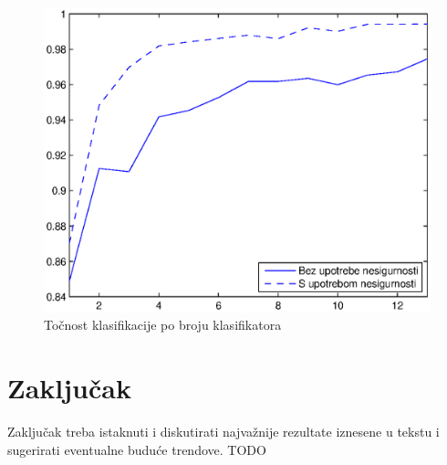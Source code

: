 \documentclass[a4paper,twocolumn,dvipdfm]{article}
\begin{document}
\begin{figure}
\centering
\includegraphics[scale=0.5]{accByClassifCount.eps}
\caption{Točnost klasifikacije po broju klasifikatora}
\label{figure:rezPoBrojuKlas}
\end{figure}


\section{Zaključak}
Zaključak treba istaknuti i diskutirati najvažnije rezultate iznesene u tekstu
i sugerirati eventualne buduće trendove. TODO



\end{document}
